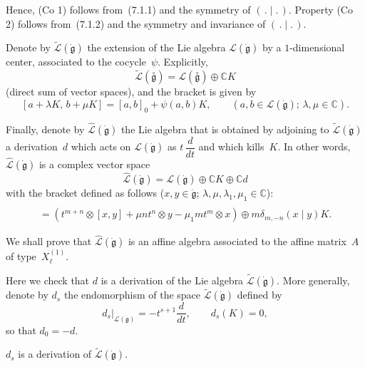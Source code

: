 \documentclass[12pt]{article}
\begin{document}
Hence, (Co 1) follows from~(7.1.1) and the symmetry of $(\,.\mid.\,)$.
Property (Co 2) follows from~(7.1.2) and the symmetry and invariance of $(\,.\mid.\,)$.

Denote by $\widetilde{\mathcal{L}}(\dot{\mathfrak{g}})$ the extension of the Lie algebra 
$\mathcal{L}(\dot{\mathfrak{g}})$ by a $1$-dimensional center, associated to the cocycle~$\psi$.
Explicitly,
\[
\widetilde{\mathcal{L}}(\overset{\circ}{\mathfrak{g}}) 
= \mathcal{L}(\overset{\circ}{\mathfrak{g}}) \oplus \mathbb{C}K
\]
(direct sum of vector spaces), and the bracket is given by
\begin{equation}\label{7.2.1}
[a + \lambda K,\, b + \mu K]
= [a,b]_0 + \psi(a,b)K,
\qquad (a,b \in \mathcal{L}(\dot{\mathfrak{g}});\, \lambda,\mu \in \mathbb{C}).
\tag{7.2.1}
\end{equation}

Finally, denote by $\widehat{\mathcal{L}}(\dot{\mathfrak{g}})$ the Lie algebra that is obtained by adjoining to
$\widetilde{\mathcal{L}}(\dot{\mathfrak{g}})$ a derivation~$d$ which acts on 
$\mathcal{L}(\dot{\mathfrak{g}})$ as $t\,\dfrac{d}{dt}$ and which kills~$K$. In other words, $\widehat{\mathcal{L}}(\dot{\mathfrak{g}})$ is a complex vector space
\[
\widehat{\mathcal{L}}(\dot{\mathfrak{g}}) 
= \mathcal{L}(\dot{\mathfrak{g}}) \oplus \mathbb{C}K \oplus \mathbb{C}d
\]
with the bracket defined as follows ($x,y \in \dot{\mathfrak{g}}$; $\lambda,\mu,\lambda_1,\mu_1 \in \mathbb{C}$):
\begin{align*}
[t^m \otimes x \oplus \lambda K \oplus \mu d,\,
t^n \otimes y \oplus \lambda_1 K \oplus \mu_1 d] \\
= (t^{m+n} \otimes [x,y] + \mu n t^n \otimes y - \mu_1 m t^m \otimes x)
  \oplus m \delta_{m,-n} (x\mid y)K.
\tag{7.2.2}
\end{align*}

We shall prove that $\widehat{\mathcal{L}}(\dot{\mathfrak{g}})$ is an affine algebra associated to the affine matrix~$A$
of type~$X_\ell^{(1)}$.

Here we check that $d$ is a derivation of the Lie algebra 
$\widetilde{\mathcal{L}}(\dot{\mathfrak{g}})$.
More generally, denote by $d_s$ the endomorphism of the space 
$\widetilde{\mathcal{L}}(\dot{\mathfrak{g}})$ defined by
\begin{equation}
d_s\big|_{\mathcal{L}(\dot{\mathfrak{g}})} = -t^{s+1} \frac{d}{dt},
\qquad
d_s(K) = 0,
\tag{7.3.1}
\end{equation}
so that $d_0 = -d$.

\begin{proposition}[7.3]
$d_s$ is a derivation of $\widetilde{\mathcal{L}}(\dot{\mathfrak{g}})$.
\end{proposition}
\end{document}
